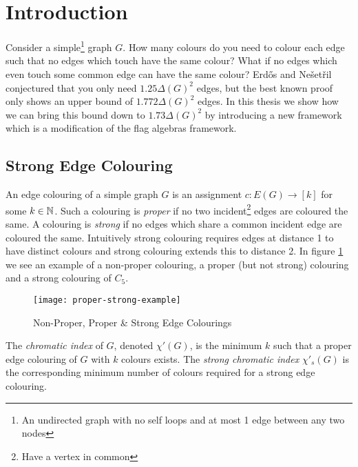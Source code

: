 \chapter*{Introduction}

Consider a simple\footnote{An undirected graph with no self loops and at most 1 edge between any two nodes} graph $G$. How many colours do you need to colour each edge such that no edges which touch
have the same colour? What if no edges which even touch some common edge can have the same colour?
Erd\H{o}s and Nešetřil conjectured that you only need $1.25\Delta(G)^2$ edges, but
the best known proof only shows an upper bound of $1.772\Delta(G)^2$ edges. In this thesis
we show how we can bring this bound down to $1.73\Delta(G)^2$ by introducing a new framework
which is a modification of the flag algebras framework.

\section*{Strong Edge Colouring}

An edge colouring of a simple graph $G$ is an assignment $c\colon E(G) \to [k]$
for some $k\in\mathbb{N}$. Such a colouring is \textit{proper} if no two incident\footnote{Have a vertex in common}
edges are coloured the same.
A colouring is \textit{strong} if no edges which share a common incident edge are
coloured the same. Intuitively strong colouring requires edges at distance 1 to have distinct
colours and strong colouring extends this to distance 2.
In figure \ref{fig:proper-strong-example} we see an example of a non-proper colouring,
a proper (but not strong) colouring and a strong colouring of $C_5$.

\begin{figure}[h]
    \centering
    \texttt{[image: proper-strong-example]}
    \caption{Non-Proper, Proper \& Strong Edge Colourings}
    \label{fig:proper-strong-example}
\end{figure}

The \textit{chromatic index} of $G$, denoted $\chi'(G)$, is the minimum $k$ such that a proper edge
colouring of $G$ with $k$ colours exists. The \textit{strong chromatic index} $\chi'_s(G)$
is the corresponding minimum number of colours required for a strong edge colouring.

